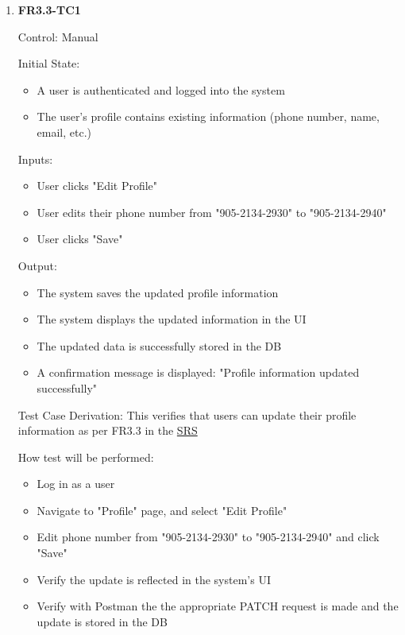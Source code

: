 \documentclass[12pt, titlepage]{article}
\begin{document}
\begin{enumerate}
    \item{\textbf{FR3.3-TC1}}
    
    Control: Manual
    
    Initial State:
    \begin{itemize}
        \item A user is authenticated and logged into the system
        \item The user's profile contains existing information (phone number, name, email, etc.)
    \end{itemize}
    
    Inputs: 
    \begin{itemize}
        \item User clicks "Edit Profile"
        \item User edits their phone number from "905-2134-2930" to "905-2134-2940"
        \item User clicks "Save"
    \end{itemize}
    
    Output: 
    \begin{itemize}
        \item The system saves the updated profile information
        \item The system displays the updated information in the UI
        \item The updated data is successfully stored in the DB
        \item A confirmation message is displayed: "Profile information updated successfully"
    \end{itemize}
    
    Test Case Derivation: This verifies that users can update their profile information as per FR3.3 in the \href{https://shorturl.at/FdAgR}{SRS}
    
    How test will be performed:
    \begin{itemize}
        \item Log in as a user
        \item Navigate to "Profile" page, and select "Edit Profile"
        \item Edit phone number from "905-2134-2930" to "905-2134-2940" and click "Save"
        \item Verify the update is reflected in the system's UI
        \item Verify with Postman the the appropriate PATCH request is made and the update is stored in the DB
    \end{itemize}
\end{enumerate}
\end{document}
